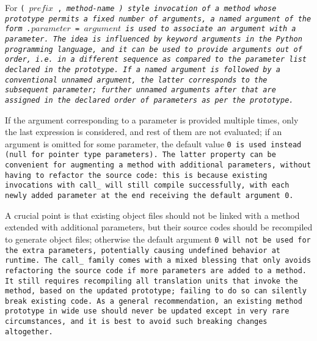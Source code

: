 For \tt{(} $prefix$ \tt{,} \it{method-name} \tt{)} style invocation of a method
whose prototype permits a fixed number of arguments, a named argument of the form
\tt{.}$parameter$ \tt{=} $argument$ is used to associate an argument with a parameter.
The idea is influenced by keyword arguments in the Python programming language,
and it can be used to provide arguments out of order, i.e. in a different
sequence as compared to the parameter list declared in the prototype.
If a named argument is followed by a conventional unnamed argument, the latter
corresponds to the subsequent parameter; further unnamed arguments after that
are assigned in the declared order of parameters as per the prototype.

If the argument corresponding to a parameter is provided multiple times,
only the last expression is considered, and rest of them are not evaluated;
if an argument is omitted for some parameter, the default
value \tt{0} is used instead (null for pointer type parameters).
The latter property can be convenient for augmenting a method with additional
parameters, without having to refactor the source code: this is because
existing invocations with \tt{call_} will still compile successfully, with
each newly added parameter at the end receiving the default argument \tt{0}.

\note A crucial point is that existing object files should not be linked with a
method extended with additional parameters, but their source codes should be
recompiled to generate object files; otherwise the default argument \tt{0} will
not be used for the extra parameters, potentially causing undefined behavior at runtime.
The \tt{call_} family comes with a mixed blessing that only avoids
refactoring the source code if more parameters are added to a method.
It still requires recompiling all translation units that invoke the method, based
on the updated prototype; failing to do so can silently break existing code.
As a general recommendation, an existing method prototype in wide
use should never be updated except in very rare circumstances,
and it is best to avoid such breaking changes altogether.
